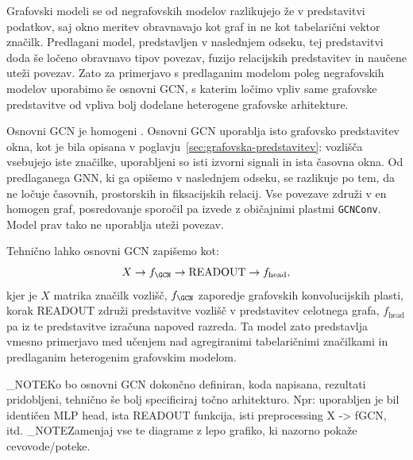 Grafovski modeli se od negrafovskih modelov razlikujejo že v predstavitvi podatkov, saj okno meritev obravnavajo kot graf in ne kot tabelarični vektor značilk.
Predlagani model, predstavljen v naslednjem odseku, tej predstavitvi doda še ločeno obravnavo tipov povezav, fuzijo relacijskih predstavitev in naučene uteži povezav.
Zato za primerjavo s predlaganim modelom poleg negrafovskih modelov uporabimo še osnovni GCN, s katerim ločimo vpliv same grafovske predstavitve od vpliva bolj dodelane heterogene grafovske arhitekture.

Osnovni GCN je homogeni \GCN{}.
Osnovni GCN uporablja isto grafovsko predstavitev okna, kot je bila opisana v poglavju~\ref{sec:grafovska-predstavitev}: vozlišča vsebujejo iste značilke, uporabljeni so isti izvorni signali in ista časovna okna.
Od predlaganega GNN, ki ga opišemo v naslednjem odseku, se razlikuje po tem, da ne ločuje časovnih, prostorskih in fiksacijskih relacij.
Vse povezave združi v en homogen graf, posredovanje sporočil pa izvede z običajnimi plastmi \texttt{GCNConv}.
Model prav tako ne uporablja uteži povezav.

Tehnično lahko osnovni GCN zapišemo kot:
\begin{equation}
    X
    \rightarrow
    f_{\GCN}
    \rightarrow
    \text{READOUT}
    \rightarrow
    f_{\text{head}},
\end{equation}
kjer je $X$ matrika značilk vozlišč, $f_{\GCN}$ zaporedje grafovskih konvolucijskih plasti, korak READOUT združi predstavitve vozlišč v predstavitev celotnega grafa, $f_{\text{head}}$ pa iz te predstavitve izračuna napoved razreda.
Ta model zato predstavlja vmesno primerjavo med učenjem nad agregiranimi tabelaričnimi značilkami in predlaganim heterogenim grafovskim modelom.

\END_NOTE{Ko bo osnovni GCN dokončno definiran, koda napisana, rezultati pridobljeni, tehnično še bolj specificiraj točno arhitekturo. Npr: uporabljen je bil identičen MLP head, ista READOUT funkcija, isti preprocessing X -> fGCN, itd.}
\END_NOTE{Zamenjaj vse te diagrame z lepo grafiko, ki nazorno pokaže cevovode/poteke.}


